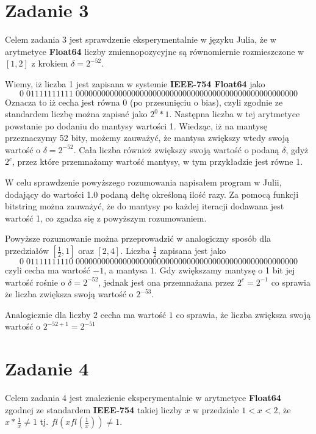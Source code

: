\documentclass[12pt]{article}
\begin{document}
\section{Zadanie 3}

Celem zadania 3 jest sprawdzenie eksperymentalnie w języku Julia, że w arytmetyce \textbf{Float64} liczby zmiennopozycyjne są równomiernie rozmieszczone w $[1, 2]$ z  krokiem $\delta = 2^{-52}$.

Wiemy, iż liczba 1 jest zapisana w systemie \textbf{IEEE-754 Float64} jako
\begin{equation*}
	0\;01111111111\;0000000000000000000000000000000000000000000000000000
\end{equation*}
Oznacza to iż cecha jest równa 0 (po przesunięciu o bias), czyli zgodnie ze standardem liczbę można zapisać jako $2^0*1$. Następna liczba w tej arytmetyce powstanie po dodaniu do mantysy wartości 1. Wiedząc, iż na mantysę przeznaczymy 52 bity, możemy zauważyć, że mantysa zwiększy wtedy swoją wartość o $\delta = 2^{-52}$. Cała liczba również zwiększy swoją wartość o podaną $\delta$, gdyż $2^c$, przez które przemnażamy wartość mantysy, w tym przykładzie jest równe 1.

W celu sprawdzenie powyższego rozumowania napisałem program w Julii, dodający do wartości 1.0 podaną deltę określoną ilość razy. Za pomocą funkcji bitstring można zauważyć, że do mantysy po każdej iteracji dodawana jest wartość 1, co zgadza się z powyższym rozumowaniem.

Powyższe rozumowanie można przeprowadzić w analogiczny sposób dla przedziałów $[\frac{1}{2}, 1]$ oraz $[2, 4]$. Liczba $\frac{1}{2}$ zapisana jest jako 
\begin{equation*}
	0\;01111111110\;0000000000000000000000000000000000000000000000000000
\end{equation*}
czyli cecha ma wartość $-1$, a mantysa $1$. Gdy zwiększamy mantysę o 1 bit jej wartość rośnie o $\delta = 2^{-52}$, jednak jest ona przemnażana przez $2^c = 2^{-1}$ co sprawia że liczba zwiększa swoją wartość o $2^{-53}$.

Analogicznie dla liczby $2$ cecha ma wartość $1$ co sprawia, że liczba zwiększa swoją wartość o $2^{-52 + 1} = 2^{-51}$ 

\section{Zadanie 4}
Celem zadania 4 jest znalezienie eksperymentalnie w arytmetyce \textbf{Float64} zgodnej ze standardem \textbf{IEEE-754} takiej liczby $x$ w przedziale $1 < x < 2$, że $x*\frac{1}{x} \neq 1$ tj. $fl(xfl(\frac{1}{x})) \neq 1$.
\end{document}
